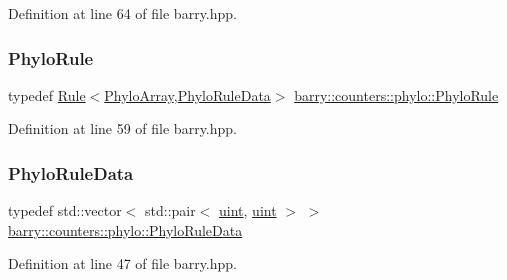 Definition at line 64 of file barry.\+hpp.

\mbox{\label{namespacebarry_1_1counters_1_1phylo_a46a7015a86c3c1f9df301fb181ccd82c}} 
\subsubsection{\texorpdfstring{Phylo\+Rule}{PhyloRule}}
{\footnotesize\ttfamily typedef \hyperlink{classbarry_1_1_rule}{Rule}$<$\hyperlink{namespacebarry_1_1counters_1_1phylo_abd293bf65e494e903639fb5fb2c91604}{Phylo\+Array},\hyperlink{namespacebarry_1_1counters_1_1phylo_a5da540950bcf3372bcedb17a5b23667c}{Phylo\+Rule\+Data}$>$ \hyperlink{namespacebarry_1_1counters_1_1phylo_a46a7015a86c3c1f9df301fb181ccd82c}{barry\+::counters\+::phylo\+::\+Phylo\+Rule}}



Definition at line 59 of file barry.\+hpp.

\mbox{\label{namespacebarry_1_1counters_1_1phylo_a5da540950bcf3372bcedb17a5b23667c}} 
\subsubsection{\texorpdfstring{Phylo\+Rule\+Data}{PhyloRuleData}}
{\footnotesize\ttfamily typedef std\+::vector$<$ std\+::pair$<$ \hyperlink{namespacebarry_a11dfc53ddb4672278319aa04f1e09a6c}{uint}, \hyperlink{namespacebarry_a11dfc53ddb4672278319aa04f1e09a6c}{uint} $>$ $>$ \hyperlink{namespacebarry_1_1counters_1_1phylo_a5da540950bcf3372bcedb17a5b23667c}{barry\+::counters\+::phylo\+::\+Phylo\+Rule\+Data}}



Definition at line 47 of file barry.\+hpp.

\mbox{\label{namespacebarry_1_1counters_1_1phylo_a7c915b4eab922a92797db96a7e8917c4}} 
